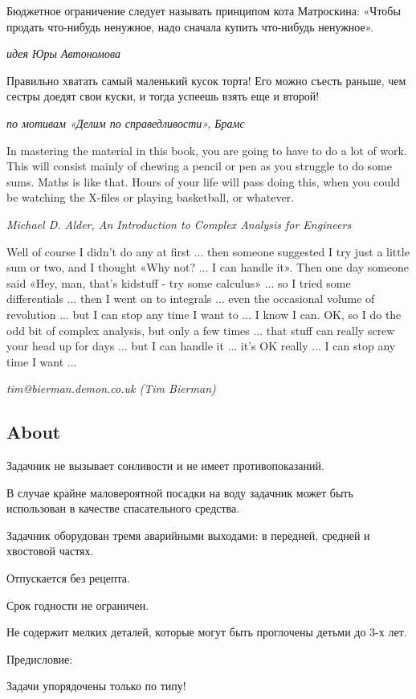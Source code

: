 Бюджетное ограничение следует называть принципом кота Матроскина: «Чтобы продать что-нибудь ненужное, надо сначала купить что-нибудь ненужное».\par
{\it идея Юры Автономова}\par

Правильно хватать самый маленький кусок торта! Его можно съесть раньше, чем сестры доедят свои куски, и тогда успеешь взять еще и второй!\par
{\it по мотивам «Делим по справедливости», Брамс}\par



In mastering the material in this book, you are going to have to do a lot of work. This will consist mainly of chewing a pencil or pen as you struggle to do some sums. Maths is like that. Hours of your life will pass doing this, when you could be watching the X-files or playing basketball, or whatever.\par
{\it Michael D. Alder, An Introduction to  Complex Analysis for Engineers}\par


Well of course I didn't do any at first ... then someone suggested I try just a little sum or two, and I thought «Why not? ... I can handle it». Then one day someone said «Hey, man, that's kidstuff - try some calculus» ... so I tried some differentials ... then I went on to integrals ... even the occasional volume of revolution ... but I can stop any time I want to ... I know I can. OK, so I do the odd bit of complex analysis, but only a few times ... that stuff can really screw your head up for days ... but I can handle it ... it's OK really ... I can stop any time I want ...\par
{\it tim@bierman.demon.co.uk (Tim Bierman)}\par



\subsection{About}

Задачник не вызывает сонливости и не имеет противопоказаний.\par
В случае крайне маловероятной посадки на воду задачник может быть использован в качестве спасательного средства. \par
Задачник оборудован тремя аварийными выходами: в передней, средней и хвостовой частях.\par
Отпускается без рецепта.\par
Срок годности не ограничен.\par
Не содержит мелких деталей, которые могут быть проглочены детьми до 3-х лет.\par
{\bf }Предисловие:\par
Задачи упорядочены только по типу!\par


